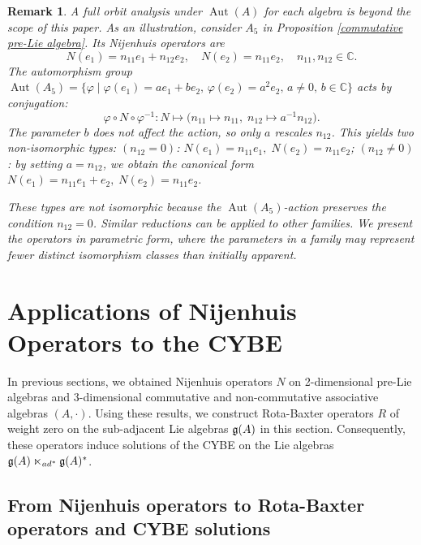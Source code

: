 \documentclass[12pt, reqno]{amsart}
\theoremstyle{plain}
\newtheorem{remark}[theorem]{Remark}
\begin{document}
\begin{remark}
A full orbit analysis under $\operatorname{Aut}(A)$ for each algebra is beyond the scope of this paper. As an illustration, consider $A_5$ in Proposition \ref{commutative pre-Lie algebra}. Its Nijenhuis operators are  
\[
N(e_1) = n_{11}e_1 + n_{12}e_2,\quad N(e_2) = n_{11}e_2,\quad n_{11}, n_{12} \in \mathbb{C}.
\]  
The automorphism group $\operatorname{Aut}(A_5) = \{\varphi \mid \varphi(e_1) = a e_1 + b e_2,\, \varphi(e_2) = a^2 e_2,\, a \ne 0,\, b \in \mathbb{C}\}$ acts by conjugation:  
\[
\varphi \circ N \circ \varphi^{-1} \colon N \mapsto \bigl(n_{11} \mapsto n_{11},\; n_{12} \mapsto a^{-1}n_{12}\bigr).
\]  
The parameter $b$ does not affect the action, so only $a$ rescales $n_{12}$. This yields two non-isomorphic types:  
 $(n_{12} = 0)$: $N(e_1) = n_{11}e_1,\; N(e_2) = n_{11}e_2$;  
$(n_{12} \ne 0)$: by setting $a = n_{12}$, we obtain the canonical form $N(e_1) = n_{11}e_1 + e_2,\; N(e_2) = n_{11}e_2$.  

These types are not isomorphic because the $\operatorname{Aut}(A_5)$-action preserves the condition $n_{12} = 0$. Similar reductions can be applied to other families. We present the operators in parametric form, where the parameters in a family may represent fewer distinct isomorphism classes than initially apparent.
\end{remark}

\section{Applications of Nijenhuis Operators to the CYBE}
In previous sections, we obtained Nijenhuis operators $N$ on 2-dimensional pre-Lie algebras and 3-dimensional commutative and non-commutative associative algebras $(A,\cdot)$. Using these results, we construct Rota-Baxter operators $R$ of weight zero on the sub-adjacent Lie algebras ${\frak g}(A)$ in this section. Consequently, these operators induce solutions of the CYBE on the Lie algebras ${\frak g}(A) \ltimes_{{\rm ad}^{\ast}} {\frak g}(A)^{\ast}$.

\subsection{From Nijenhuis operators to Rota-Baxter operators and CYBE solutions}
\end{document}
